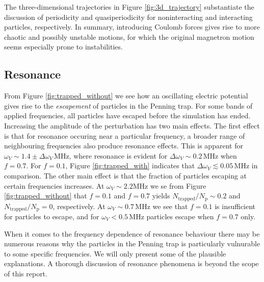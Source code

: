 The three-dimensional trajectories in Figure \ref{fig:3d_trajectory} substantiate the discussion of periodicity and quasiperiodicity for noninteracting and interacting particles, respectively. In summary, introducing Coulomb forces gives rise to more chaotic and possibly unstable motions, for which the original magnetron motion seems especially prone to instabilities.




\subsection{Resonance}


From Figure \ref{fig:trapped_without} we see how an oscillating electric potential gives rise to the \textit{escapement} of particles in the Penning trap. For some bands of applied frequencies, all particles have escaped before the simulation has ended. Increasing the amplitude of the perturbation has two main effects. The first effect is that for resonance occuring near a particular frequency, a broader range of neighbouring frequencies also produce resonance effects. This is apparent for $\omega_V\sim1.4\pm\Delta\omega_V\,\mathrm{MHz}$, where resonance is evident for $\Delta\omega_V\sim0.2\,\mathrm{MHz}$ when $f=0.7$. For $f=0.1$, Figure \ref{fig:trapped_with} indicates that $\Delta\omega_V\lesssim0.05\,\mathrm{MHz}$ in comparison. The other main effect is that the fraction of particles escaping at certain frequencies increases. At $\omega_V\sim2.2\mathrm{MHz}$ we se from Figure \ref{fig:trapped_without} that $f=0.1$ and $f=0.7$ yields $N_\mathrm{trapped}/N_\mathrm{p}\sim0.2$ and $N_\mathrm{trapped}/N_\mathrm{p}=0$, respectively. At $\omega_V\sim0.7\,\mathrm{MHz}$ we see that $f=0.1$ is insufficient for particles to escape, and for $\omega_V<0.5\,\mathrm{MHz}$ particles escape when $f=0.7$ only. 

When it comes to the frequency dependence of resonance behaviour there may be numerous reasons why the particles in the Penning trap is particularly vulnurable to some specific frequencies. We will only present some of the plausible explanations. A thorough discussion of resonance phenomena is beyond the scope of this report. 

